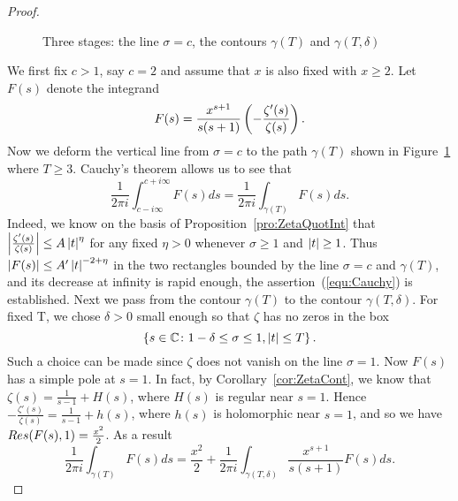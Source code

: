 \begin{proof}
\begin{figure}[!htb]
\caption{Three stages: the line $\sigma = c$, the contours $\gamma(T)$ and $\gamma(T, \delta)$}
\label{fig:ContourGamma2}
\end{figure}
	We first fix $c > 1$, say $c = 2$ and assume that $x$ is also fixed with $x \geq 2$. Let $F(s)$ denote the integrand
\begin{equation}\label{equ:Cauchy}
	F(s) = \frac{x^{s + 1}}{s(s + 1)} \left(-\frac{\zeta'(s)}{\zeta(s)}\right).
\end{equation}
	Now we deform the vertical line from $\sigma = c$ to the path $\gamma(T)$ shown in Figure~\ref{fig:ContourGamma2} where $T \geq 3$. Cauchy's theorem allows us to see that
\begin{equation*}
	\frac{1}{2 \pi i} \int _{c - i \infty} ^{c + i \infty} F(s) ds = \frac{1}{2 \pi i} \int _{\gamma(T)} F(s) ds.
\end{equation*}
	Indeed, we know on the basis of Proposition~\ref{pro:ZetaQuotInt} that $\left|\frac{\zeta'(s)}{\zeta(s)}\right| \leq A\left|t\right|^\eta$ for any fixed $\eta > 0$ whenever $\sigma \geq 1$ and $\left|t\right| \geq 1$. Thus $\left|F(s)\right| \leq A'\left|t\right|^{-2 + \eta}$ in the two rectangles bounded by the line $\sigma = c$ and $\gamma(T)$, and its decrease at infinity is rapid enough, the assertion~(\ref{equ:Cauchy}) is established.
	Next we pass from the contour $\gamma(T)$ to the contour $\gamma(T, \delta)$. For fixed T, we chose $\delta > 0$ small enough so that $\zeta$ has no zeros in the box
\begin{equation*}
	\left\{s \in \mathbb{C} \colon 1 - \delta \leq \sigma \leq 1, \left|t\right| \leq T\right\}.
\end{equation*}
	Such a choice can be made since $\zeta$ does not vanish on the line $\sigma = 1$. Now $F(s)$ has a simple pole at $s = 1$. In fact, by Corollary~\ref{cor:ZetaCont}, we know that $\zeta(s) = \frac{1}{s - 1} + H(s)$, where $H(s)$ is regular near $s = 1$. Hence $-\frac{\zeta'(s)}{\zeta(s)} =\frac{1}{s - 1} + h(s)$, where $h(s)$ is holomorphic near $s = 1$, and so we have $\mathop{Res}(F(s), 1) = \frac{x^2}{2}$. As a result
\begin{equation*}
	\frac{1}{2 \pi i} \int _{\gamma(T)} F(s) ds = \frac{x^2}{2} + \frac{1}{2 \pi i} \int _{\gamma(T, \delta)} \frac{x^{s + 1}}{s(s + 1)} F(s) ds.

\end{equation*}
\end{proof}
